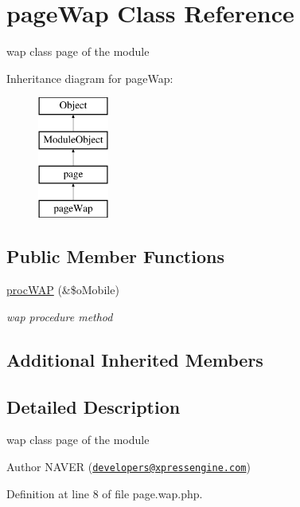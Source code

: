 \hypertarget{classpageWap}{\section{page\+Wap Class Reference}
\label{classpageWap}
}


wap class page of the module  


Inheritance diagram for page\+Wap\+:\begin{figure}[H]
\begin{center}
\leavevmode
\includegraphics[height=4.000000cm]{classpageWap}
\end{center}
\end{figure}
\subsection*{Public Member Functions}
\begin{DoxyCompactItemize}
\item 
\hyperlink{classpageWap_a7ee56942979074bd2b79621dfc7349e9}{proc\+W\+A\+P} (\&\$o\+Mobile)
\begin{DoxyCompactList}\small\item\em wap procedure method \end{DoxyCompactList}\end{DoxyCompactItemize}
\subsection*{Additional Inherited Members}


\subsection{Detailed Description}
wap class page of the module 

\begin{DoxyAuthor}{Author}
N\+A\+V\+E\+R (\href{mailto:developers@xpressengine.com}{\tt developers@xpressengine.\+com}) 
\end{DoxyAuthor}


Definition at line 8 of file page.\+wap.\+php.



